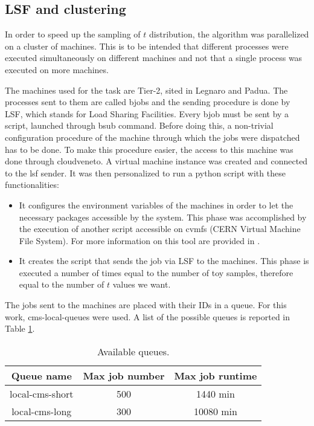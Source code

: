 \subsection{LSF and clustering}
In order to speed up the sampling of $t$ distribution, the algorithm was parallelized on a cluster of machines. This is to be intended that different processes were executed simultaneously on different machines and not that a single process was executed on more machines.

The machines used for the task are Tier-2, sited in Legnaro and Padua. The processes sent to them are called bjobs and the sending procedure is done by LSF, which stands for Load Sharing Facilities. Every bjob must be sent by a script, launched through bsub command. Before doing this, a non-trivial configuration procedure of the machine through which the jobs were dispatched has to be done. To make this procedure easier, the access to this machine was done through cloudveneto. A virtual machine instance was created and connected to the lsf sender. It was then personalized to run a python script with these functionalities:
\begin{itemize}
	\item It configures the environment variables of the machines in order to let the necessary packages accessible by the system. This phase was accomplished by the execution of another script accessible on cvmfs (CERN Virtual Machine File System). For more information on this tool are provided in \cite{cvmfs}.
	\item It creates the script that sends the job via LSF to the machines. This phase is executed a number of times equal to the number of toy samples, therefore equal to the number of $t$ values we want.
\end{itemize}

The jobs sent to the machines are placed with their IDs in a queue. For this work, cms-local-queues were used. A list of the possible queues is reported in Table \ref{tab:QUEUES}.

\begin{table}[H]
	\centering
	\begin{tabular}{c c c}
		\toprule
		Queue name	&	Max job number	&	Max job runtime	\\
		\midrule
		local-cms-short	&	500			&	1440 min		\\
		local-cms-long	&	300			&	10080 min		\\
		\bottomrule
	\end{tabular}
	\caption{Available queues.}
	\label{tab:QUEUES}
\end{table}

